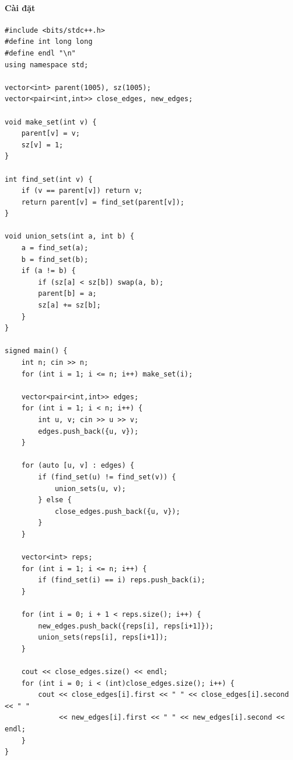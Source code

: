 \paragraph{Cài đặt}
\begin{lstlisting}
#include <bits/stdc++.h>
#define int long long
#define endl "\n"
using namespace std;

vector<int> parent(1005), sz(1005);
vector<pair<int,int>> close_edges, new_edges;

void make_set(int v) {
    parent[v] = v;
    sz[v] = 1;
}

int find_set(int v) {
    if (v == parent[v]) return v;
    return parent[v] = find_set(parent[v]);
}

void union_sets(int a, int b) {
    a = find_set(a);
    b = find_set(b);
    if (a != b) {
        if (sz[a] < sz[b]) swap(a, b);
        parent[b] = a;
        sz[a] += sz[b];
    }
}

signed main() {
    int n; cin >> n;
    for (int i = 1; i <= n; i++) make_set(i);

    vector<pair<int,int>> edges;
    for (int i = 1; i < n; i++) {
        int u, v; cin >> u >> v;
        edges.push_back({u, v});
    }

    for (auto [u, v] : edges) {
        if (find_set(u) != find_set(v)) {
            union_sets(u, v);
        } else {
            close_edges.push_back({u, v});
        }
    }

    vector<int> reps;
    for (int i = 1; i <= n; i++) {
        if (find_set(i) == i) reps.push_back(i);
    }

    for (int i = 0; i + 1 < reps.size(); i++) {
        new_edges.push_back({reps[i], reps[i+1]});
        union_sets(reps[i], reps[i+1]);
    }

    cout << close_edges.size() << endl;
    for (int i = 0; i < (int)close_edges.size(); i++) {
        cout << close_edges[i].first << " " << close_edges[i].second << " " 
             << new_edges[i].first << " " << new_edges[i].second << endl;
    }
}
\end{lstlisting}

